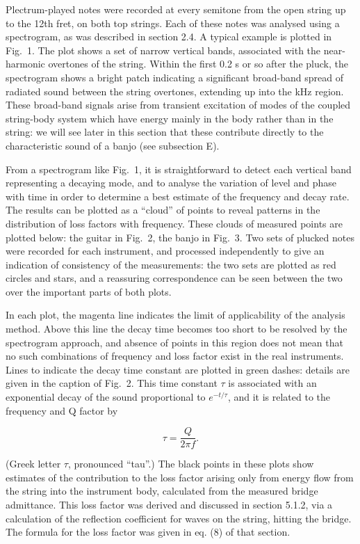   Plectrum-played notes were recorded at every semitone from the open string up 
  to the 12th fret, on both top strings. Each of these notes was analysed using 
  a spectrogram, as was described in section 2.4. A typical example is plotted 
  in Fig.\ 1. The plot shows a set of narrow vertical bands, associated with 
  the near-harmonic overtones of the string. Within the first 0.2 s or so after 
  the pluck, the spectrogram shows a bright patch indicating a significant 
  broad-band spread of radiated sound between the string overtones, extending 
  up into the kHz region. These broad-band signals arise from transient 
  excitation of modes of the coupled string-body system which have energy 
  mainly in the body rather than in the string: we will see later in this 
  section that these contribute directly to the characteristic sound of a banjo 
  (see subsection E). 

  From a spectrogram like Fig.\ 1, it is straightforward to detect each 
  vertical band representing a decaying mode, and to analyse the variation of 
  level and phase with time in order to determine a best estimate of the 
  frequency and decay rate. The results can be plotted as a ``cloud'' of points 
  to reveal patterns in the distribution of loss factors with frequency. These 
  clouds of measured points are plotted below: the guitar in Fig.\ 2, the banjo 
  in Fig.\ 3. Two sets of plucked notes were recorded for each instrument, and 
  processed independently to give an indication of consistency of the 
  measurements: the two sets are plotted as red circles and stars, and a 
  reassuring correspondence can be seen between the two over the important 
  parts of both plots. 

  In each plot, the magenta line indicates the limit of applicability of the 
  analysis method. Above this line the decay time becomes too short to be 
  resolved by the spectrogram approach, and absence of points in this region 
  does not mean that no such combinations of frequency and loss factor exist in 
  the real instruments. Lines to indicate the decay time constant are plotted 
  in green dashes: details are given in the caption of Fig.\ 2. This time 
  constant $\tau$ is associated with an exponential decay of the sound 
  proportional to $e^{-t/\tau}$, and it is related to the frequency and Q 
  factor by 

  $$\tau=\frac{Q}{2 \pi f} . \tag{1}$$ 

  (Greek letter $\tau$, pronounced ``tau''.) The black points in these plots 
  show estimates of the contribution to the loss factor arising only from 
  energy flow from the string into the instrument body, calculated from the 
  measured bridge admittance. This loss factor was derived and discussed in 
  section 5.1.2, via a calculation of the reflection coefficient for waves on 
  the string, hitting the bridge. The formula for the loss factor was given in 
  eq. (8) of that section. 

